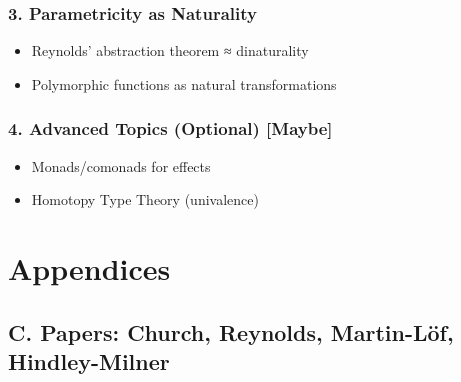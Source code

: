 \documentclass[11pt]{article}
\begin{document}
\subsubsection{3. Parametricity as Naturality}
\label{sec:orgda6cabd}
\begin{itemize}
\item Reynolds’ abstraction theorem ≈ dinaturality
\item Polymorphic functions as natural transformations
\end{itemize}

\subsubsection{4. Advanced Topics (Optional) [Maybe]}
\label{sec:orga5cb5b8}
\begin{itemize}
\item Monads/comonads for effects
\item Homotopy Type Theory (univalence)
\end{itemize}

\section{Appendices}
\label{sec:orgc4545e1}
\subsection{C. Papers: Church, Reynolds, Martin-Löf, Hindley-Milner}
\label{sec:org86fe2e7}
\end{document}
